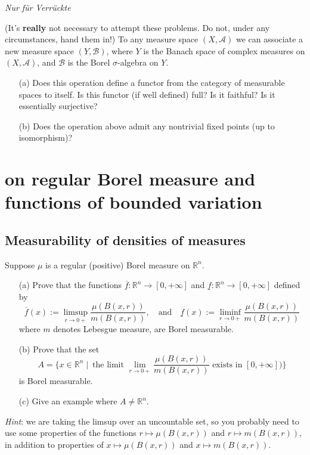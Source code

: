 \documentclass[lang=cn,11pt]{elegantbook}
\begin{document}
\vspace*{10mm}
\begin{center}
  \textit{Nur f\"ur Verr\"uckte}
\end{center}
(It's \textbf{really} not necessary to attempt these problems. Do not, under any circumstances, hand them in!)
  To any measure space $(X,\mathcal{A})$ we can associate a new measure space $(Y,\mathcal{B})$, where $Y$ is the Banach space of complex measures on $(X,\mathcal{A})$, and $\mathcal{B}$ is the Borel $\sigma$-algebra on $Y$.
  \begin{itemize}
  \item[(a)]Does this operation define a functor from the category of measurable spaces to itself. Is this functor (if well defined) full? Is it faithful? Is it essentially surjective?
  \item[(b)]Does the operation above admit any nontrivial fixed points (up to isomorphism)?
  \end{itemize}
  




\chapter{on regular Borel measure and functions of bounded variation}

\section{Measurability of densities of measures}
  Suppose $\mu$ is a regular (positive) Borel measure on $\mathbb{R}^n$.
  \begin{itemize}
  \item[(a)]Prove that the functions $\overline f\colon\mathbb{R}^n\to[0,+\infty]$ and $\underline f\colon\mathbb{R}^n\to[0,+\infty]$ defined by    \[
      \overline f(x):=\limsup_{r\to0+}\frac{\mu(B(x,r))}{m(B(x,r))},
      \quad\text{and}\quad
      \underline f(x):=\liminf_{r\to0+}\frac{\mu(B(x,r))}{m(B(x,r))}
    \]
    where $m$ denotes Lebesgue measure, are Borel measurable.
  \item[(b)]Prove that the set \[  A=\{x\in\mathbb{R}^n\mid\ \text{the limit $\lim_{r\to0+}\frac{\mu(B(x,r))}{m(B(x,r))}$ exists in $[0,+\infty]$)}\}
    \]    is Borel measurable.
  \item[(c)] Give an example where $A\ne\mathbb{R}^n$.
  \end{itemize}
\textit{Hint}: we are taking the limsup over an uncountable set, so you probably need to use some properties of the functions $r\mapsto\mu(B(x,r))$ and $r\mapsto m(B(x,r))$, in addition to properties of  $x\mapsto\mu(B(x,r))$ and $x\mapsto m(B(x,r))$.
  
\end{document}
